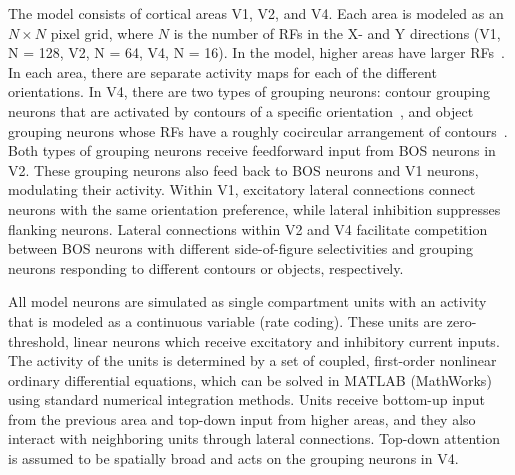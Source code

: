 \documentclass[11pt,notitlepage]{article}
\begin{document}
The model consists of cortical areas V1, V2, and V4. Each area is
modeled as an $N\times N$ pixel grid, where $N$ is the number of RFs
in the X- and Y directions (V1, N = 128, V2, N = 64, V4, N = 16).  In
the model, higher areas have larger RFs~\citep{Poort_etal12}. In each
area, there are separate activity maps for each of the different
orientations.  In V4, there are two types of grouping neurons: contour
grouping neurons that are activated by contours of a specific
orientation~\citep{Chen_etal14}, and object grouping neurons whose RFs
have a roughly cocircular arrangement of
contours~\citep{Mihalas_etal11b}. Both types of grouping neurons
receive feedforward input from BOS neurons in V2. These grouping
neurons also feed back to BOS neurons and V1 neurons, modulating their
activity. Within V1, excitatory lateral connections connect neurons
with the same orientation preference, while lateral inhibition
suppresses flanking neurons. Lateral connections within V2 and V4
facilitate competition between BOS neurons with different
side-of-figure selectivities and grouping neurons responding to
different contours or objects, respectively.

All model neurons are simulated as single compartment units with an
activity that is modeled as a continuous variable (rate coding). These
units are zero-threshold, linear neurons which receive excitatory and
inhibitory current inputs. The activity of the units is determined by
a set of coupled, first-order nonlinear ordinary differential
equations, which can be solved in MATLAB (MathWorks) using standard
numerical integration methods.  Units receive bottom-up input from the
previous area and top-down input from higher areas, and they also
interact with neighboring units through lateral connections. Top-down
attention is assumed to be spatially broad and acts on the grouping
neurons in V4.
\end{document}
